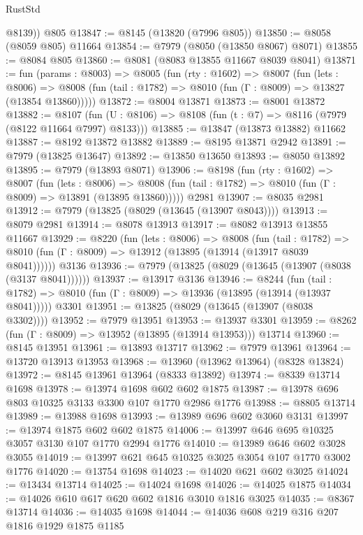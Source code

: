 \begin{lexlean}{RustStd}
\begin{coremodule}
        @8139))
    @805
@13847 := @8145 (@13820 (@7996 @805))
@13850 := @8058 (@8059 @805) @11664
@13854 := @7979 (@8050 (@13850 @8067) @8071)
@13855 := @8084 @805
@13860 := @8081 (@8083 @13855 @11667 @8039 @8041)
@13871 := fun (params : @8003) =>
  @8005
    (fun (rty : @1602) =>
    @8007
      (fun (lets : @8006) =>
      @8008 (fun (tail : @1782) => @8010 (fun (Γ : @8009) => @13827 (@13854 @13860)))))
@13872 := @8004 @13871
@13873 := @8001 @13872
@13882 := @8107
    (fun (U : @8106) => @8108 (fun (t : @7) => @8116 (@7979 (@8122 @11664 @7997) @8133)))
@13885 := @13847 (@13873 @13882) @11662
@13887 := @8192 @13872 @13882
@13889 := @8195 @13871 @2942
@13891 := @7979 (@13825 @13647)
@13892 := @13850 @13650
@13893 := @8050 @13892
@13895 := @7979 (@13893 @8071)
@13906 := @8198
    (fun (rty : @1602) =>
    @8007
      (fun (lets : @8006) =>
      @8008 (fun (tail : @1782) => @8010 (fun (Γ : @8009) => @13891 (@13895 @13860)))))
    @2981
@13907 := @8035 @2981
@13912 := @7979 (@13825 (@8029 (@13645 (@13907 @8043))))
@13913 := @8079 @2981
@13914 := @8078 @13913
@13917 := @8082 @13913 @13855 @11667
@13929 := @8220
    (fun (lets : @8006) =>
    @8008
      (fun (tail : @1782) =>
      @8010 (fun (Γ : @8009) => @13912 (@13895 (@13914 (@13917 @8039 @8041))))))
    @3136
@13936 := @7979 (@13825 (@8029 (@13645 (@13907 (@8038 (@3137 @8041))))))
@13937 := @13917 @3136
@13946 := @8244
    (fun (tail : @1782) => @8010 (fun (Γ : @8009) => @13936 (@13895 (@13914 (@13937 @8041)))))
    @3301
@13951 := @13825 (@8029 (@13645 (@13907 (@8038 @3302))))
@13952 := @7979 @13951
@13953 := @13937 @3301
@13959 := @8262 (fun (Γ : @8009) => @13952 (@13895 (@13914 @13953))) @13714
@13960 := @8145 @13951
@13961 := @13893 @13717
@13962 := @7979 @13961
@13964 := @13720 @13913 @13953
@13968 := @13960 (@13962 @13964) (@8328 @13824)
@13972 := @8145 @13961 @13964 (@8333 @13892)
@13974 := @8339 @13714 @1698
@13978 := @13974 @1698 @602 @602 @1875
@13987 := @13978 @696 @803 @10325 @3133 @3300 @107 @1770 @2986 @1776
@13988 := @8805 @13714
@13989 := @13988 @1698
@13993 := @13989 @696 @602 @3060 @3131
@13997 := @13974 @1875 @602 @602 @1875
@14006 := @13997 @646 @695 @10325 @3057 @3130 @107 @1770 @2994 @1776
@14010 := @13989 @646 @602 @3028 @3055
@14019 := @13997 @621 @645 @10325 @3025 @3054 @107 @1770 @3002 @1776
@14020 := @13754 @1698
@14023 := @14020 @621 @602 @3025
@14024 := @13434 @13714
@14025 := @14024 @1698
@14026 := @14025 @1875
@14034 := @14026 @610 @617 @620 @602 @1816 @3010 @1816 @3025
@14035 := @8367 @13714
@14036 := @14035 @1698
@14044 := @14036 @608 @219 @316 @207 @1816 @1929 @1875 @1185

\end{coremodule}
\end{lexlean}
